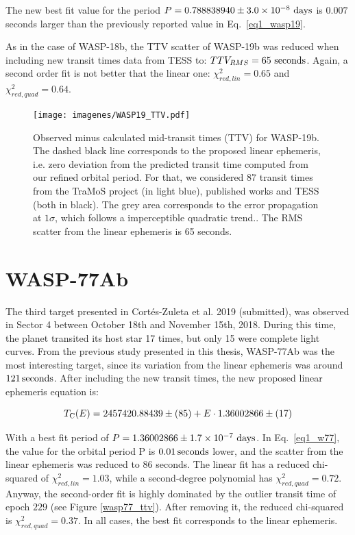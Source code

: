 The new best fit value for the period $P=0.788838940 \pm 3.0\times10^{-8} ~\rm days$ is $0.007$ seconds larger than the previously reported value in Eq.~\ref{eq1_wasp19}.

As in the case of WASP-18b, the TTV scatter of WASP-19b was reduced when including new transit times data from TESS to: $TTV_{RMS}=65~\rm seconds$. Again, a second order fit is not better that the linear one: $\chi^{2}_{red,lin}= 0.65$ and $\chi^{2}_{red,quad}= 0.64$. 

\begin{figure}[ht]
\texttt{[image: imagenes/WASP19\_TTV.pdf]}
\caption{Observed minus calculated mid-transit times (TTV) for WASP-19b. The dashed black line corresponds to the proposed linear ephemeris, i.e. zero deviation from the predicted transit time  computed from our refined orbital period. For that, we considered 87 transit times from the TraMoS project (in light blue), published works and TESS (both in black). The grey area corresponds to the error propagation at $1\sigma$, which follows a imperceptible quadratic trend.. The RMS scatter from the linear ephemeris is 65 seconds.}
\label{wasp19_ttv}
\end{figure}

\section{WASP-77Ab}

The third target presented in Cortés-Zuleta et al. 2019 (submitted), was observed in Sector 4 between October 18th and November 15th, 2018.  During this time, the planet transited its host star 17 times, but only 15 were complete light curves. From the previous study presented in this thesis, WASP-77Ab was the most interesting target, since its variation from the linear ephemeris was around  $121\,\rm seconds$.  After including the new transit times, the new proposed linear ephemeris equation is:

\begin{equation}
T_{\rm C}(E)=2457420.88439\pm(85)+E \cdot 1.36002866 \pm(17)
\end{equation}

With a best fit period of $P=1.36002866 \pm 1.7\times10^{-7} ~\rm days$. In Eq.~\ref{eq1_w77}, the value for the orbital period P is $0.01\,\rm seconds$ lower, and the scatter from the linear ephemeris was reduced to 86 seconds. The linear fit has a reduced chi-squared of $\chi^2_{red,lin}=1.03$, while a second-degree polynomial has $\chi^2_{red,quad}=0.72$. Anyway, the second-order fit is highly dominated by the outlier transit time of epoch $229$ (see Figure \ref{wasp77_ttv}). After removing it, the reduced chi-squared is  $\chi^2_{red,quad}=0.37$. In all cases, the best fit corresponds to the linear ephemeris.


